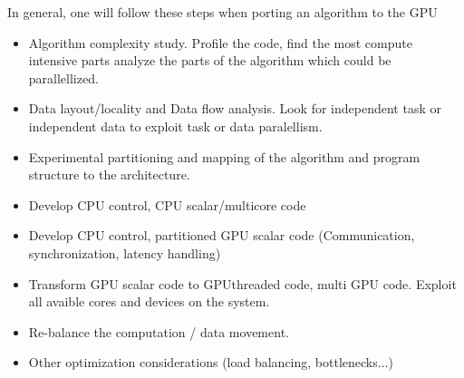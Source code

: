 In general, one will follow these steps when porting an algorithm to the \gls{GPU}
\begin{itemize}
	\item Algorithm complexity study. Profile the code, find the most compute
intensive parts analyze the parts of the algorithm which could be parallellized.
	\item Data layout/locality and Data flow analysis. Look for independent task or 
	independent data to exploit task or data paralellism.
	\item Experimental partitioning and mapping of the algorithm and program 
		structure to the architecture. 
	\item Develop \gls{CPU} control, \gls{CPU} scalar/multicore code
	\item Develop \gls{CPU} control, partitioned \gls{GPU} scalar code (Communication, 
		synchronization, latency handling)
	\item Transform \gls{GPU} scalar code to \gls{GPU}threaded code, multi \gls{GPU} code. 
	Exploit all avaible cores and devices on the system. 
	\item Re-balance the computation / data movement. 
	\item Other optimization considerations (load balancing, bottlenecks...)
\end{itemize}


